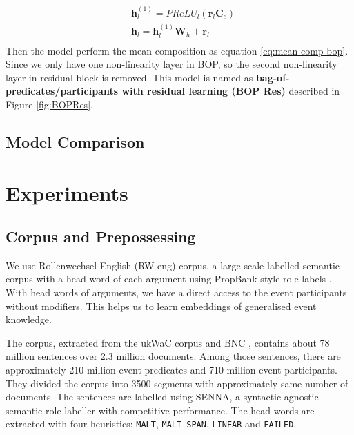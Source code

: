 \documentclass[a4paper]{article}
\begin{document}
\begin{equation} \label{eq:hidden-bopres}
\begin{aligned}
    & \mathbf{h}_l^{(1)}
        = PReLU_l(\mathbf{r}_l \mathbf{C}_e) \\
    & \mathbf{h}_{l}
        = \mathbf{h}_{l}^{(1)}\mathbf{W}_h + \mathbf{r}_l \\
\end{aligned}
\end{equation}
Then the model perform the mean composition as  equation \eqref{eq:mean-comp-bop}. Since we only have one non-linearity layer in BOP, so the second non-linearity layer in residual block is removed. This model is named as \textbf{bag-of-predicates/participants with residual learning (BOP Res)} described in Figure \ref{fig:BOPRes}. 


\subsection{Model Comparison} \label{sec:comp-bop}



\newpage
\section{Experiments}  \label{sec:exp}
\subsection{Corpus and Prepossessing} \label{sec:corpus}
We use Rollenwechsel-English (RW-eng) corpus, a large-scale labelled semantic corpus with a head word of each argument using PropBank style role labels \citep{SayeedEtAl2015}. With head words of arguments, we have a direct access to the event participants without modifiers. This helps us to learn embeddings of generalised event knowledge. 

The corpus, extracted from the ukWaC corpus \citep{ferraresi2008introducing} and BNC \citep{british2007british}, contains about 78 million sentences over 2.3 million documents. Among those sentences, there are approximately 210 million event predicates and 710 million event participants. They divided the corpus into 3500 segments with approximately same number of documents. The sentences are labelled using SENNA, a syntactic agnostic semantic role labeller with competitive performance. The head words are extracted with four heuristics: \texttt{MALT}, \texttt{MALT-SPAN}, \texttt{LINEAR} and \texttt{FAILED}. 
\end{document}
